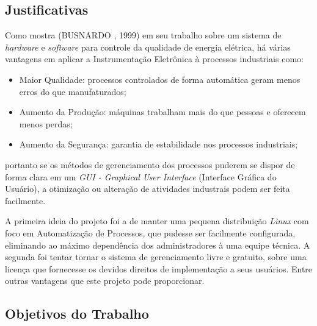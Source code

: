 \documentclass[a4paper, 12pt]{article}
\begin{document}
\subsection{Justificativas}
\indent\indent Como mostra (BUSNARDO , 1999) em seu trabalho sobre um sistema de \textit{hardware} e \textit{software} para controle da qualidade de 
energia elétrica, há várias vantagens em aplicar a Instrumentação Eletrônica à processos industriais como:

\begin{itemize}
\item Maior Qualidade: processos controlados de forma automática geram menos erros do que manufaturados;
\item Aumento da Produção: máquinas trabalham mais do que pessoas e oferecem menos perdas;
\item Aumento da Segurança: garantia de estabilidade nos processos industriais;
\end{itemize}

portanto se os métodos de gerenciamento dos processos puderem se dispor de forma clara em um \textit{GUI - Graphical User Interface} (Interface Gráfica
do Usuário), a otimização ou alteração de atividades industrais podem ser feita facilmente. 


\indent A primeira ideia do projeto foi a de manter uma pequena distribuição \textit{Linux} com foco em Automatização de Processos, que pudesse ser 
facilmente configurada, eliminando ao máximo dependência dos administradores à uma equipe técnica. A segunda foi tentar tornar o sistema de gerenciamento 
livre e gratuito, sobre uma licença que fornecesse os devidos direitos de implementação a seus usuários. Entre outras vantagens que este projeto pode proporcionar.

\subsection{Objetivos do Trabalho}
\end{document}
